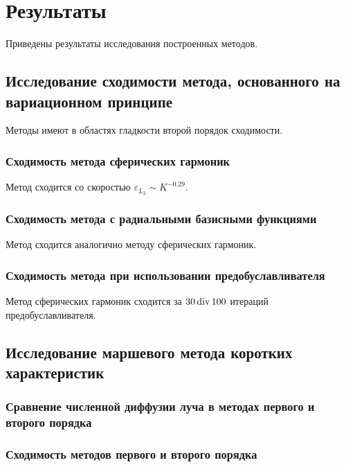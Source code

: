 \chapter{Результаты}

Приведены результаты исследования построенных методов.

\section{Исследование сходимости метода, основанного на вариационном принципе}

Методы имеют в областях гладкости второй порядок сходимости.

\subsection{Сходимость метода сферических гармоник}

Метод сходится со скоростью $\varepsilon_{L_2} \sim K^{-0.29}$.

\subsection{Сходимость метода с радиальными базисными функциями}

Метод сходится аналогично методу сферических гармоник.

\subsection{Сходимость метода при использовании предобуславливателя}

Метод сферических гармоник сходится за $30 \dividesymbol 100$ итераций предобуславливателя.

\section{Исследование маршевого метода коротких характеристик}

\subsection{Сравнение численной диффузии луча в методах первого и второго порядка}

\subsection{Сходимость методов первого и второго порядка}

